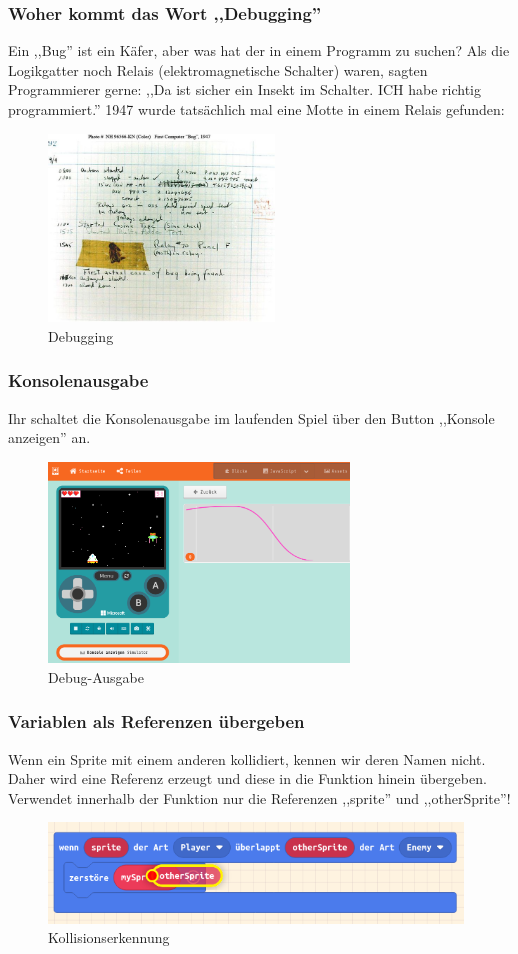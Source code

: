 \documentclass{beamer}
\begin{document}
 \begin{frame}
 \frametitle{Woher kommt das Wort ,,Debugging''}
Ein ,,Bug'' ist ein Käfer, aber was hat der in einem Programm zu suchen? Als die Logikgatter noch Relais (elektromagnetische Schalter) waren, sagten Programmierer gerne: ,,Da ist sicher ein Insekt im Schalter. ICH habe richtig programmiert.'' 1947 wurde tatsächlich mal eine Motte in einem Relais gefunden:  

 
 \begin{figure}
  \includegraphics[width=6cm]{debug.jpeg}
  \caption{Debugging}
  \label{fig:debugging}
\end{figure}
\end{frame}

 \begin{frame}
 \frametitle{Konsolenausgabe}
Ihr schaltet die Konsolenausgabe im laufenden Spiel über den Button ,,Konsole anzeigen'' an. 
 
 \begin{figure}
  \includegraphics[width=8cm]{game17.png}
  \caption{Debug-Ausgabe}
  \label{fig:game17}
\end{figure}
\end{frame}


 \begin{frame}
 \frametitle{Variablen als Referenzen übergeben}
Wenn ein Sprite mit einem anderen kollidiert, kennen wir deren Namen nicht. Daher wird eine Referenz erzeugt und diese in die Funktion hinein übergeben. Verwendet innerhalb der Funktion nur die Referenzen ,,sprite'' und ,,otherSprite''! 
 
 \begin{figure}
  \includegraphics[width=11cm]{game05.png}
  \caption{Kollisionserkennung}
  \label{fig:game5}
\end{figure}
\end{frame}
\end{document}
